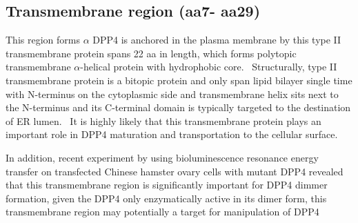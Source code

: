 \subsection{Transmembrane region (aa7- aa29)}

This region forms $\alpha$
DPP4 is anchored in the plasma membrane by this type II transmembrane protein spans 22 aa in length, which forms polytopic transmembrane $\alpha$-helical protein with hydrophobic core.~\cite{Hong_1990} Structurally, type II transmembrane protein is a bitopic protein and only span lipid bilayer single time with N-terminus on the cytoplasmic side and transmembrane helix sits next to the N-terminus and its C-terminal domain is typically targeted to the destination of ER lumen.~\cite{Luckey} It is highly likely that this transmembrane protein plays an important role in DPP4 maturation and transportation to the cellular surface. 
\par 
In addition, recent experiment by \citet{Chung_2010} using bioluminescence resonance energy transfer on transfected Chinese hamster ovary cells with mutant DPP4 revealed that this transmembrane region is significantly important for DPP4 dimmer formation, given the DPP4 only enzymatically active in its dimer form, this transmembrane region may potentially a target for manipulation of DPP4 
